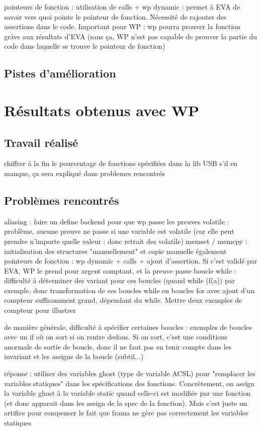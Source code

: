 pointeurs de fonction : utilisation de calls + wp dynamic : permet à EVA de savoir vers quoi pointe le pointeur de fonction. Nécessité de rajouter des assertions dans le code. Important pour WP : wp pourra prouver la fonction grâve aux résultats d'EVA (sans ça, WP n'est pas capable de prouver la partie du code dans laquelle se trouve le pointeur de fonction)


\subsection{Pistes d'amélioration}


\section{Résultats obtenus avec WP}

\subsection{Travail réalisé}

chiffrer à la fin le pourcentage de fonctions spécifiées dans la lib USB
s'il en manque, ça sera expliqué dans problemes rencontrés

\subsection{Problèmes rencontrés}

aliasing : faire un define backend pour que wp passe les preuves
volatile : problème, aucune preuve ne passe si une variable est volatile (car elle peut prendre n'importe quelle valeur : donc retrait des volatile)
memset / memcpy : initialisation des structures "manuellement" et copie manuelle également
pointeurs de fonction : wp dynamic + calls + ajout d'assertion. Si c'est validé par EVA, WP le prend pour argent comptant, et la preuve passe
boucle while : difficulté à déterminer des variant pour ces boucles (quand while (f(a)) par exemple, donc transformation de ces boucles while en boucles for avec ajout d'un compteur suffisamment grand, dépendant du while. Mettre deux exemples de compteur pour illustrer

de manière générale, difficulté à spécifier certaines boucles : exemples de boucles avec un if où on sort si on rentre dedans. Si on sort, c'est une conditions anormale de sortie de boucle, donc il ne faut pas en tenir compte dans les invariant et les assigns de la boucle (subtil...)

réponse : utiliser des variables ghost (type de variable ACSL) pour "remplacer les variables statiques" dans les spécifications des fonctions. Concrètement, on assign la variable ghost à la variable static quand celle-ci est modifiée par une fonction (et donc apparait dans les assign de la spec de la fonction). Mais c'est juste un artifice pour compenser le fait que frama ne gère pas correctement les variables statiques

